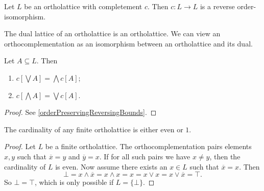 \begin{lemma}
Let $L$ be an ortholattice with completement $c$. Then $c: L \to L$ is a reverse order-isomorphism.
\end{lemma}
\begin{corollary}
The dual lattice of an ortholattice is an ortholattice. We can view an orthocomplementation as an isomorphism between an ortholattice and its dual.
\end{corollary}
\begin{corollary}
Let $A\subseteq L$. Then
\begin{enumerate}
\item $c\left[\bigvee A\right] = \bigwedge c[A]$;
\item $c\left[\bigwedge A\right] = \bigvee c[A]$.
\end{enumerate}
\end{corollary}
\begin{proof}
See \ref{orderPreservingReversingBounds}.
\end{proof}

\begin{proposition}
The cardinality of any finite ortholattice is either even or $1$.
\end{proposition}
\begin{proof}
Let $L$ be a finite ortholattice.
The orthocomplementation pairs elements $x,y$ such that $\overline{x} = y$ and $\overline{y} = x$. If for all such pairs we have $x\neq y$, then the cardinality of $L$ is even. Now assume there exists an $x\in L$ such that $\overline{x} = x$. Then 
\[ \bot = x\wedge \overline{x} = x\wedge x = x = x\vee x = x\vee \overline{x} = \top. \]
So $\bot = \top$, which is only possible if $L = \{\bot\}$.
\end{proof}


